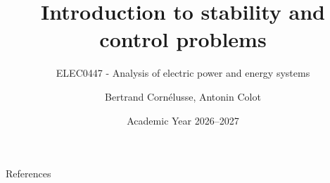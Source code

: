 \documentclass[aspectratio=169]{beamer}
\subtitle{ELEC0447 - Analysis of electric power and energy systems}
\title{Introduction to stability and control problems}
\author[BC]{Bertrand Cornélusse, Antonin Colot}
\institute{University of Liège}
\date{Academic Year 2026--2027}
\begin{document}


\begin{frame}[allowframebreaks]{References}
    
        
\end{frame}
\end{document}
